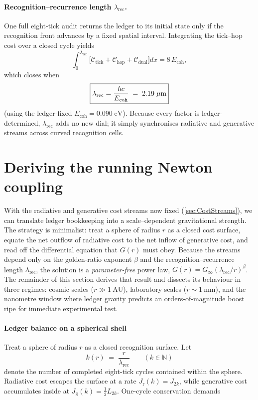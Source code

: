 \documentclass[11pt,oneside]{book}
\begin{document}
{\paragraph*{Recognition–recurrence length \(\lambda_{\text{rec}}\).}
One full eight-tick audit returns the ledger to its initial state only
if the recognition front advances by a fixed spatial interval.  
Integrating the tick–hop cost over a closed cycle yields
\[
  \int_{0}^{\lambda_{\text{rec}}}
       \bigl[\mathcal C_{\text{tick}}+
             \mathcal C_{\text{hop}}+
             \mathcal C_{\text{dual}}\bigr]dx
  = 8\,E_{\text{coh}},
\]
which closes when
\[
  \boxed{%
    \lambda_{\text{rec}}
      = \frac{\hbar c}{E_{\text{coh}}}
      \;=\; 2.19\;\mu\text{m}}
\]
(using the ledger-fixed \(E_{\text{coh}}=0.090\;\text{eV}\)).  
Because every factor is ledger-determined, \(\lambda_{\text{rec}}\) adds
no new dial; it simply synchronises radiative and generative streams
across curved recognition cells.


\section{Deriving the running Newton coupling}

With the radiative and generative cost streams now fixed
(\autoref{sec:CostStreams}), we can translate ledger bookkeeping into a
scale–dependent gravitational strength.  The strategy is minimalist:
treat a sphere of radius \(r\) as a closed cost surface, equate the net
outflow of radiative cost to the net inflow of generative cost, and read
off the differential equation that \(G(r)\) must obey.  Because the
streams depend only on the golden-ratio exponent \(\beta\) and the
recognition–recurrence length \(\lambda_{\text{rec}}\), the solution is
a \emph{parameter-free} power law,
\(G(r)=G_{\infty}(\lambda_{\text{rec}}/r)^{\beta}\).
The remainder of this section derives that result and dissects its
behaviour in three regimes: cosmic scales (\(r\gg1~\text{AU}\)),
laboratory scales (\(r\sim1~\text{mm}\)), and the nanometre window where
ledger gravity predicts an orders-of-magnitude boost ripe for immediate
experimental test.
\paragraph{Ledger balance on a spherical shell}
Treat a sphere of radius \(r\) as a closed recognition surface.  
Let
\[
   k(r)\;=\;\frac{r}{\lambda_{\text{rec}}}
   \qquad (k\in\mathbb N)
\]
denote the number of completed eight-tick cycles contained within the
sphere.  Radiative cost escapes the surface at a rate
\(J_{\mathrm r}(k)=J_{2k}\), while generative cost accumulates inside at
\(J_{\mathrm g}(k)=\tfrac12 L_{2k}\).  One-cycle conservation demands

}
\end{document}
